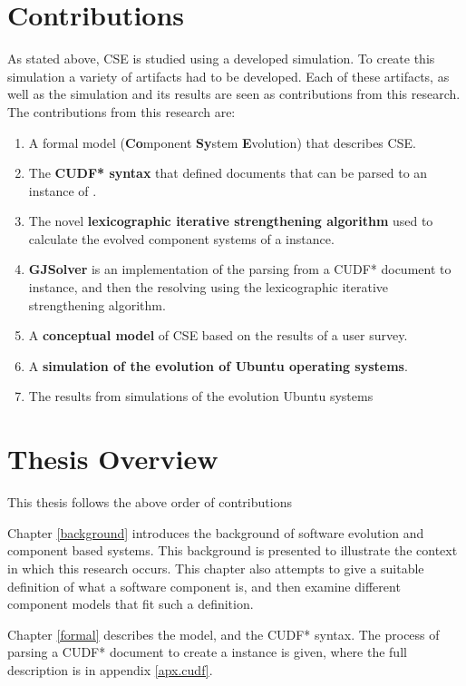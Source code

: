 \section{Contributions}
As stated above, CSE is studied using a developed simulation.
To create this simulation a variety of artifacts had to be developed.
Each of these artifacts, as well as the simulation and its results are seen as contributions from this research. 
The contributions from this research are:
\begin{enumerate}
  \item A formal model \textbf{\modelname} (\textbf{Co}mponent \textbf{Sy}stem \textbf{E}volution) that describes CSE. 
  \item The \textbf{CUDF* syntax} that defined documents that can be parsed to an instance of \modelname.
  \item The novel \textbf{lexicographic iterative strengthening algorithm} used to calculate the evolved component systems of a \modelname instance.
  \item \textbf{GJSolver} is an implementation of the parsing from a CUDF* document to \modelname instance, and then the resolving using the lexicographic iterative strengthening algorithm.
  \item A \textbf{conceptual model} of CSE based on the results of a user survey. 
  \item A \textbf{simulation of the evolution of Ubuntu operating systems}.
  \item The results from simulations of the evolution Ubuntu systems
\end{enumerate}

\section{Thesis Overview}
This thesis follows the above order of contributions

Chapter \ref{background} introduces the background of software evolution and component based systems.
This background is presented to illustrate the context in which this research occurs.
This chapter also attempts to give a suitable definition of what a software component is, and then examine different component models that fit such a definition.

Chapter \ref{formal} describes the \modelname model, and the CUDF* syntax.
The process of parsing a CUDF* document to create a \modelname instance is given, where the full description is in appendix \ref{apx.cudf}.

